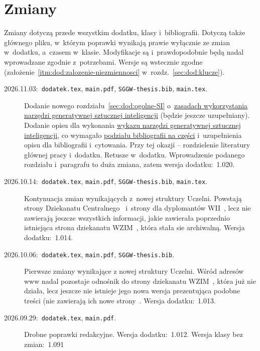 \newpage

\section{Zmiany}
\label{sec:dod:zmiany}
Zmiany dotyczą przede wszystkim dodatku, klasy i~bibliografii. Dotyczą także głównego pliku, w~którym poprawki wynikają prawie wyłącznie ze zmian w~dodatku, a~czasem w~klasie. Modyfikacje są i~prawdopodobnie będą nadal wprowadzane zgodnie z~potrzebami. Wersje są wstecznie zgodne (założenie~\ref{itm:dod:zalozenie-niezmiennosci} w~rozdz.~\ref{sec:dod:klucze}). 

\begin{description}
\item[\rm 2026.11.03:~{\tt dodatek.tex}, {\tt main.pdf}, {\tt SGGW-thesis.bib}, {\tt main.tex}.]\mbox{}\linebreak Dodanie nowego rozdziału~\ref{sec:dod:ogolne-SI} o~\hyperref[sec:dod:ogolne-SI]{zasadach wykorzystania narzędzi generatywnej sztucznej inteligencji} (będzie jeszcze uzupełniany). Dodanie opisu dla wykonania \hyperref[sec:dod:bibliografia-SI]{wykazu narzędzi generatywnej sztucznej inteligencji}, co wymagało \hyperref[sec:dod:bibliografia-wiele]{podziału bibliografii na części} i~uzupełnienia opisu dla bibliografii i~cytowania. Przy tej okazji -- rozdzielenie literatury głównej pracy i~dodatku. Retusze w~dodatku. Wprowadzenie podanego rozdziału i~paragrafu to duża zmiana, zatem wersja dodatku:~1.020.
\item[\rm 2026.10.14:~{\tt dodatek.tex}, {\tt main.pdf}, {\tt SGGW-thesis.bib}, {\tt main.tex}.]\mbox{}\linebreak Kontynuacja zmian wynikających z~nowej struktury Uczelni. Powstają strony Dziekanatu Centralnego~ i~strony dla dyplomantów WII~, lecz nie zawierają jeszcze wszystkich informacji, jakie zawierała poprzednio istniejąca strona dziekanatu WZIM~, która stała sie archiwalną. Wersja dodatku:~1.014.
\item[\rm 2026.10.06:~{\tt dodatek.tex}, {\tt main.pdf}, {\tt SGGW-thesis.bib}.] Pierwsze zmiany wynikające z nowej struktury Uczelni. Wśród adresów www nadal pozostaje odnośnik do strony dziekanatu WZIM~, która już nie działa, lecz jeszcze nie istnieje jego nowa wersja prezentująca podobne treści (nie zawierają ich nowe strony~. Wersja dodatku:~1.013.
\item[\rm 2026.09.29:~{\tt dodatek.tex}, {\tt main.pdf}.] Drobne poprawki redakcyjne. Wersja dodatku:~1.012. Wersja klasy bez zmian:~1.091

\end{description}
